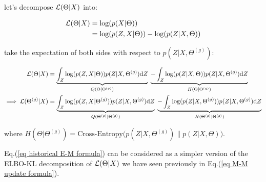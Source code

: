 \documentclass{article}
\def\L{{\cal L}}
\def\d{\text{d}}
\begin{document}
let's decompose $\L(\Theta|X)$ into:

\begin{equation}\begin{split}
\L(\Theta|X) &= \log (p(X |\Theta))\\
&= \log (p(Z,X|\Theta) ) -  \log ( p(Z|X,\Theta) )\\
\end{split}\end{equation}

take the expectation of both sides with respect to $ p(Z|X,\Theta^{(g)}) $:

\begin{equation}\begin{split}\label{eq historical E-M formula}
\L(\Theta|X) &= 
\underbrace{\int_{Z } \log (p(Z,X|\Theta)) p(Z|X,\Theta^{(g)}) \d Z}_{Q ( \Theta | \Theta^{(g)}) } \; \underbrace{-  \int_{Z } \log (p(Z|X,\Theta)) p(Z|X,\Theta^{(g)}) \d Z}_{H (\Theta | \Theta^{(g)})}\\
\implies \L(\Theta^{(g)}|X) &=
\underbrace{\int_{Z } \log (p(Z,X|\Theta^{(g)})) p(Z|X,\Theta^{(g)}) \d Z}_{Q ( \Theta^{(g)} | \Theta^{(g)}) } \; \underbrace{-  \int_{Z } \log (p(Z|X,\Theta^{(g)})) p(Z|X,\Theta^{(g)}) \d Z}_{H (\Theta^{(g)} | \Theta^{(g)})}\\
\end{split}\end{equation}

where $H (\Theta | \Theta^{(g)}) = \text{Cross-Entropy} \big(p(Z|X,\Theta^{(g)}) \|  p(Z|X,\Theta) \big)$. 

\vspace{2mm}

Eq.(\ref{eq historical E-M formula}) can be considered as a simpler version of the ELBO-KL decomposition of $\L(\Theta | X)$ we have seen previously in Eq.(\ref{eq M-M update formula}).



\end{document}
